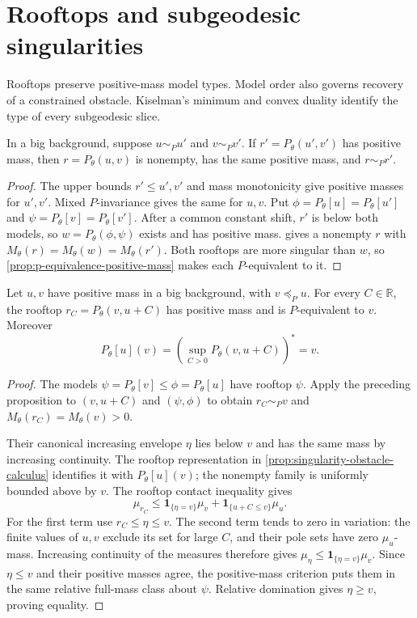 \section{Rooftops and subgeodesic singularities}
\label{sec:p-types-rooftops-subgeodesics}
Rooftops preserve positive-mass model types. Model order also governs recovery of a constrained obstacle. Kiselman's minimum and convex duality identify the type of every subgeodesic slice.

\begin{proposition}\label{prop:rooftops-preserve-positive-p-type}
In a big background, suppose $u\sim_P u'$ and $v\sim_P v'$. If $r'=P_\theta(u',v')$ has positive mass, then $r=P_\theta(u,v)$ is nonempty, has the same positive mass, and $r\sim_P r'$.
\end{proposition}
\begin{proof}
The upper bounds $r'\leq u',v'$ and mass monotonicity give positive masses for $u',v'$. Mixed $P$-invariance gives the same for $u,v$. Put
$\phi=P_\theta[u]=P_\theta[u']$ and $\psi=P_\theta[v]=P_\theta[v']$.
After a common constant shift, $r'$ is below both models, so $w=P_\theta(\phi,\psi)$ exists and has positive mass.  gives a nonempty $r$ with $M_\theta(r)=M_\theta(w)=M_\theta(r')$. Both rooftops are more singular than $w$, so \cref{prop:p-equivalence-positive-mass} makes each $P$-equivalent to it.
\end{proof}

\begin{corollary}\label{cor:ordered-p-constrained-envelope}
Let $u,v$ have positive mass in a big background, with $v\preceq_P u$. For every $C\in\mathbb R$, the rooftop $r_C=P_\theta(v,u+C)$ has positive mass and is $P$-equivalent to $v$. Moreover
\[
 P_\theta[u](v)=\left(\sup_{C>0}P_\theta(v,u+C)\right)^*=v.
\]
\end{corollary}
\begin{proof}
The models $\psi=P_\theta[v]\leq\phi=P_\theta[u]$ have rooftop $\psi$. Apply the preceding proposition to $(v,u+C)$ and $(\psi,\phi)$ to obtain $r_C\sim_P v$ and $M_\theta(r_C)=M_\theta(v)>0$.

Their canonical increasing envelope $\eta$ lies below $v$ and has the same mass by increasing continuity. The rooftop representation in \cref{prop:singularity-obstacle-calculus} identifies it with $P_\theta[u](v)$; the nonempty family is uniformly bounded above by $v$. The rooftop contact inequality gives
\[
 \mu_{r_C}\leq\mathbf1_{\{\eta=v\}}\mu_v
                       +\mathbf1_{\{u+C\leq v\}}\mu_u.
\]
For the first term use $r_C\leq\eta\leq v$. The second term tends to zero in variation: the finite values of $u,v$ exclude its set for large $C$, and their pole sets have zero $\mu_u$-mass. Increasing continuity of the measures therefore gives
$\mu_\eta\leq\mathbf1_{\{\eta=v\}}\mu_v$.
Since $\eta\leq v$ and their positive masses agree, the positive-mass criterion puts them in the same relative full-mass class about $\psi$. Relative domination gives $\eta\geq v$, proving equality.
\end{proof}

